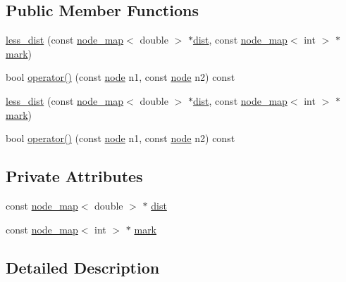 \subsection*{Public Member Functions}
\begin{DoxyCompactItemize}
\item 
\mbox{\hyperlink{classless__dist_a103396a9986a15a532b2e5eea09d5ac8}{less\+\_\+dist}} (const \mbox{\hyperlink{classnode__map}{node\+\_\+map}}$<$ double $>$ $\ast$\mbox{\hyperlink{classless__dist_a5e27ffa3cd5b99bcf5c205fc021ddbb8}{dist}}, const \mbox{\hyperlink{classnode__map}{node\+\_\+map}}$<$ int $>$ $\ast$\mbox{\hyperlink{classless__dist_a7905c2d559b1b629175fc810c643375c}{mark}})
\item 
bool \mbox{\hyperlink{classless__dist_ad60cec2a03ca609f0f4af0818ee9caeb}{operator()}} (const \mbox{\hyperlink{classnode}{node}} n1, const \mbox{\hyperlink{classnode}{node}} n2) const
\item 
\mbox{\hyperlink{classless__dist_a103396a9986a15a532b2e5eea09d5ac8}{less\+\_\+dist}} (const \mbox{\hyperlink{classnode__map}{node\+\_\+map}}$<$ double $>$ $\ast$\mbox{\hyperlink{classless__dist_a5e27ffa3cd5b99bcf5c205fc021ddbb8}{dist}}, const \mbox{\hyperlink{classnode__map}{node\+\_\+map}}$<$ int $>$ $\ast$\mbox{\hyperlink{classless__dist_a7905c2d559b1b629175fc810c643375c}{mark}})
\item 
bool \mbox{\hyperlink{classless__dist_ad60cec2a03ca609f0f4af0818ee9caeb}{operator()}} (const \mbox{\hyperlink{classnode}{node}} n1, const \mbox{\hyperlink{classnode}{node}} n2) const
\end{DoxyCompactItemize}
\subsection*{Private Attributes}
\begin{DoxyCompactItemize}
\item 
const \mbox{\hyperlink{classnode__map}{node\+\_\+map}}$<$ double $>$ $\ast$ \mbox{\hyperlink{classless__dist_a5e27ffa3cd5b99bcf5c205fc021ddbb8}{dist}}
\item 
const \mbox{\hyperlink{classnode__map}{node\+\_\+map}}$<$ int $>$ $\ast$ \mbox{\hyperlink{classless__dist_a7905c2d559b1b629175fc810c643375c}{mark}}
\end{DoxyCompactItemize}


\subsection{Detailed Description}


